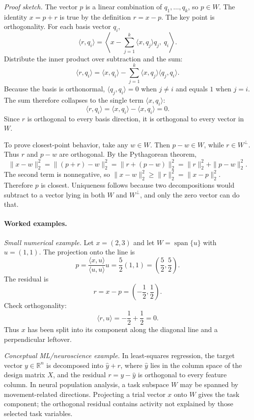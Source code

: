 \emph{Proof sketch.} The vector \(p\) is a linear combination of \(q_1,\dots,q_k\), so \(p\in W\). The identity \(x=p+r\) is true by the definition \(r=x-p\). The key point is orthogonality. For each basis vector \(q_i\),
\[
\langle r,q_i\rangle
=\left\langle x-\sum_{j=1}^k \langle x,q_j\rangle q_j,\ q_i\right\rangle.
\]
Distribute the inner product over subtraction and the sum:
\[
\langle r,q_i\rangle
=\langle x,q_i\rangle-\sum_{j=1}^k \langle x,q_j\rangle\langle q_j,q_i\rangle.
\]
Because the basis is orthonormal, \(\langle q_j,q_i\rangle=0\) when \(j\ne i\) and equals \(1\) when \(j=i\). The sum therefore collapses to the single term \(\langle x,q_i\rangle\):
\[
\langle r,q_i\rangle=\langle x,q_i\rangle-\langle x,q_i\rangle=0.
\]
Since \(r\) is orthogonal to every basis direction, it is orthogonal to every vector in \(W\).

To prove closest-point behavior, take any \(w\in W\). Then \(p-w\in W\), while \(r\in W^\perp\). Thus \(r\) and \(p-w\) are orthogonal. By the Pythagorean theorem,
\[
\|x-w\|_2^2=\|(p+r)-w\|_2^2
=\|r+(p-w)\|_2^2
=\|r\|_2^2+\|p-w\|_2^2.
\]
The second term is nonnegative, so \(\|x-w\|_2^2\ge \|r\|_2^2=\|x-p\|_2^2\). Therefore \(p\) is closest. Uniqueness follows because two decompositions would subtract to a vector lying in both \(W\) and \(W^\perp\), and only the zero vector can do that.

\paragraph{Worked examples.}
\emph{Small numerical example.} Let \(x=(2,3)\) and let \(W=\operatorname{span}\{u\}\) with \(u=(1,1)\). The projection onto the line is
\[
p=\frac{\langle x,u\rangle}{\langle u,u\rangle}u
=\frac{5}{2}(1,1)
=\left(\frac52,\frac52\right).
\]
The residual is
\[
r=x-p=\left(-\frac12,\frac12\right).
\]
Check orthogonality:
\[
\langle r,u\rangle=-\frac12+\frac12=0.
\]
Thus \(x\) has been split into its component along the diagonal line and a perpendicular leftover.

\emph{Conceptual ML/neuroscience example.} In least-squares regression, the target vector \(y\in\mathbb{R}^n\) is decomposed into \(\hat y+r\), where \(\hat y\) lies in the column space of the design matrix \(X\), and the residual \(r=y-\hat y\) is orthogonal to every feature column. In neural population analysis, a task subspace \(W\) may be spanned by movement-related directions. Projecting a trial vector \(x\) onto \(W\) gives the task component; the orthogonal residual contains activity not explained by those selected task variables.

